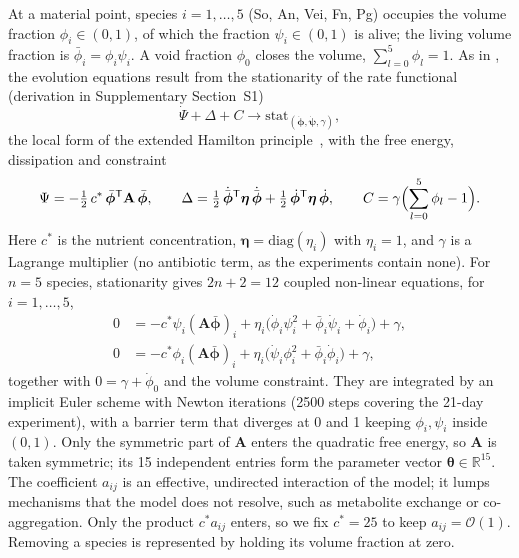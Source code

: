 \documentclass[preprint,12pt]{elsarticle}
\newcommand{\btheta}{\boldsymbol{\theta}}
\newcommand{\bphi}{\boldsymbol{\phi}}
\newcommand{\bpsi}{\boldsymbol{\psi}}
\begin{document}
At a material point, species $i=1,\dots,5$ (So, An, Vei, Fn, Pg) occupies the volume fraction $\phi_i\in(0,1)$, of which the fraction $\psi_i\in(0,1)$ is alive; the living volume fraction is $\bar\phi_i=\phi_i\psi_i$.
A void fraction $\phi_0$ closes the volume, $\sum_{l=0}^{5}\phi_l=1$.
As in \citet{Klempt2025ContinuumBiofilm}, the evolution equations result from the stationarity of the rate functional (derivation in Supplementary Section~S1)
\begin{equation}
\dot\Psi+\Delta+C\rightarrow\mathrm{stat}_{(\dot{\bphi},\dot{\bpsi},\gamma)},
\label{eq:stat}
\end{equation}
the local form of the extended Hamilton principle~\citep{JunkerBalzani2021ExtendedHamilton, JunkerBodeHackl2025Holistic, junker2014principle, hackl1997generalized}, with the free energy, dissipation and constraint
\begin{equation}
\Psi=-\tfrac12\,c^*\,\bar{\bphi}^{\mathsf T}\mathbf{A}\,\bar{\bphi},\qquad
\Delta=\tfrac12\,\dot{\bar{\bphi}}^{\mathsf T}\boldsymbol\eta\,\dot{\bar{\bphi}}+\tfrac12\,\dot{\bphi}^{\mathsf T}\boldsymbol\eta\,\dot{\bphi},\qquad
C=\gamma\Bigl(\sum_{l=0}^{5}\phi_l-1\Bigr).
\label{eq:potentials}
\end{equation}
Here $c^*$ is the nutrient concentration, $\boldsymbol\eta=\mathrm{diag}(\eta_i)$ with $\eta_i=1$, and $\gamma$ is a Lagrange multiplier (no antibiotic term, as the experiments contain none).
For $n=5$ species, stationarity gives $2n+2=12$ coupled non-linear equations, for $i=1,\dots,5$,
\begin{align}
0&=-c^*\psi_i(\mathbf{A}\bar{\bphi})_i+\eta_i\bigl(\dot\phi_i\psi_i^2+\bar\phi_i\dot\psi_i+\dot\phi_i\bigr)+\gamma,\label{eq:phi}\\
0&=-c^*\phi_i(\mathbf{A}\bar{\bphi})_i+\eta_i\bigl(\dot\psi_i\phi_i^2+\bar\phi_i\dot\phi_i\bigr)+\gamma,\label{eq:psi}
\end{align}
together with $0=\gamma+\dot\phi_0$ and the volume constraint.
They are integrated by an implicit Euler scheme with Newton iterations (2500 steps covering the 21-day experiment), with a barrier term that diverges at 0 and 1 keeping $\phi_i,\psi_i$ inside $(0,1)$.
Only the symmetric part of $\mathbf{A}$ enters the quadratic free energy, so $\mathbf{A}$ is taken symmetric; its 15 independent entries form the parameter vector $\btheta\in\mathbb{R}^{15}$.
The coefficient $a_{ij}$ is an effective, undirected interaction of the model; it lumps mechanisms that the model does not resolve, such as metabolite exchange or co-aggregation.
Only the product $c^*a_{ij}$ enters, so we fix $c^*=25$ to keep $a_{ij}=\mathcal{O}(1)$.
Removing a species is represented by holding its volume fraction at zero.
\end{document}
